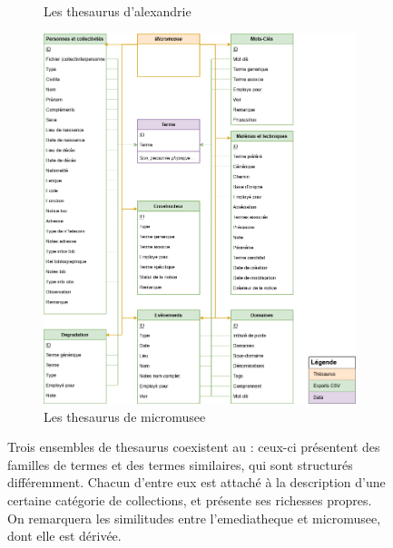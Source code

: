 \begin{figure}[htbp]
\begin{subfigure}{0.45\textwidth}
		\caption{Les \gls{thesaurus} d'\gls{alexandrie}}
		\label{uml:alexandrie}
	\end{subfigure}
	\hfill
	\begin{subfigure}{0.5\textwidth}
		\centering
		\includegraphics[width=\linewidth]{img/UML_micromusee}
		\caption{Les \gls{thesaurus} de \gls{micromusee}}
		\label{uml:micromusee}
	\end{subfigure}
	\caption[Construction des \gls{thesaurus} du \mae]{Trois ensembles de \gls{thesaurus} coexistent au \mae : ceux-ci présentent des familles de termes et des termes similaires, qui sont structurés différemment. Chacun d'entre eux est attaché à la description d'une certaine catégorie de collections, et présente ses richesses propres. On remarquera les similitudes entre l'\gls{emediatheque} et \gls{micromusee}, dont elle est dérivée.}
	\label{fig:thesaurusmusee}
\end{figure}


\bigskip

